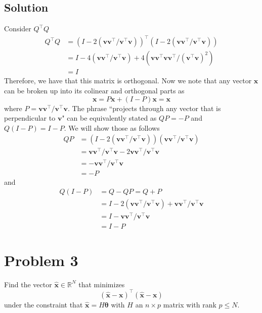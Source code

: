 \documentclass[a4paper]{article}
\begin{document}
\subsection*{Solution}%
Consider $Q^\top Q$
\[
  \begin{aligned}
    Q^\top Q &= (I - 2(\mathbf{v}\mathbf{v}^{\top}/\mathbf{v}^{\top}\mathbf{v}))^{\top}(I - 2(\mathbf{v}\mathbf{v}^{\top}/\mathbf{v}^{\top}\mathbf{v})) \\
             &= I - 4(\mathbf{v}\mathbf{v}^\top/\mathbf{v}^\top\mathbf{v}) + 4(\mathbf{v}\mathbf{v}^\top \mathbf{v}\mathbf{v}^\top/(\mathbf{v}^\top\mathbf{v})^2) \\
             &= I
  \end{aligned}
\]
Therefore, we have that this matrix is orthogonal. Now we note that any vector $\mathbf{x}$ can be broken up into its colinear and orthogonal parts as
\[
  \mathbf{x} = P\mathbf{x} + (I - P)\mathbf{x} = \mathbf{x}
\]
where $P = \mathbf{v}\mathbf{v}^\top/\mathbf{v}^\top\mathbf{v}$. The phrase ``projects through any vector that is perpendicular to $\mathbf{v}$" can be equivalently stated as $QP = -P$ and $Q(I-P) = I-P$. We will show those as follows
\[
  \begin{aligned}
    QP &=(I - 2(\mathbf{v}\mathbf{v}^{\top}/\mathbf{v}^{\top}\mathbf{v}))(\mathbf{v}\mathbf{v}^\top/\mathbf{v}^\top\mathbf{v}) \\
       &= \mathbf{v}\mathbf{v}^\top/\mathbf{v}^\top\mathbf{v} - 2\mathbf{v}\mathbf{v}^\top/\mathbf{v}^\top\mathbf{v} \\
       &= -\mathbf{v}\mathbf{v}^\top/\mathbf{v}^\top\mathbf{v} \\
       &= -P
  \end{aligned}
\]
and 
\[
  \begin{aligned}
    Q(I - P) &= Q - QP = Q + P \\
    &= I - 2(\mathbf{v}\mathbf{v}^\top/\mathbf{v}^\top\mathbf{v}) + \mathbf{v}\mathbf{v}^\top/\mathbf{v}^\top\mathbf{v} \\
    &= I - \mathbf{v}\mathbf{v}^\top/\mathbf{v}^\top\mathbf{v} \\
    &= I - P
  \end{aligned}
\]

\section*{Problem 3}%
Find the vector $\hat{\mathbf{x}} \in \mathds{R}^N$ that minimizes 
\[
  (\hat{\mathbf{x}} - \mathbf{x})^\top(\hat{\mathbf{x}} - \mathbf{x})
\]
under the constraint that $\hat{\mathbf{x}} = H\bm{\theta}$ with $H$ an $n \times p$ matrix with rank $p \leq N$.
\end{document}
